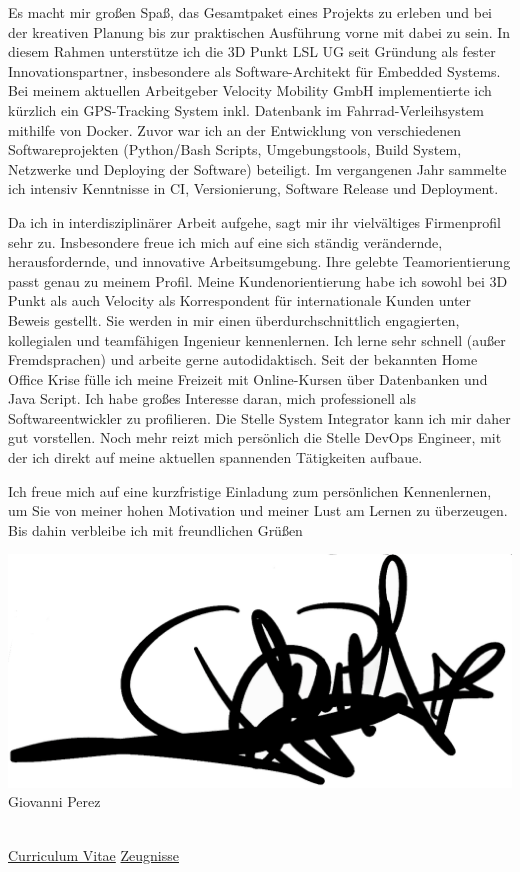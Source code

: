 \documentclass[a4paper,10pt]{article}
\begin{document}
Es macht mir großen Spaß, das Gesamtpaket eines Projekts zu erleben und bei der kreativen Planung bis zur praktischen Ausführung vorne mit dabei zu sein. In diesem Rahmen unterstütze ich die 3D Punkt LSL UG seit Gründung als fester Innovationspartner, insbesondere als Software-Architekt für Embedded Systems. Bei meinem aktuellen Arbeitgeber Velocity Mobility GmbH implementierte ich kürzlich ein GPS-Tracking System inkl. Datenbank im Fahrrad-Verleihsystem mithilfe von Docker. Zuvor war ich an der Entwicklung von verschiedenen Softwareprojekten (Python/Bash Scripts, Umgebungstools, Build System, Netzwerke und Deploying der Software) beteiligt. Im vergangenen Jahr sammelte ich intensiv Kenntnisse in CI, Versionierung, Software Release und Deployment.  \vfill

Da ich in interdisziplinärer Arbeit aufgehe, sagt mir ihr vielvältiges Firmenprofil sehr zu. Insbesondere freue ich mich auf eine sich ständig verändernde, herausfordernde, und innovative Arbeitsumgebung. Ihre gelebte Teamorientierung passt genau zu meinem Profil. Meine Kundenorientierung habe ich sowohl bei 3D Punkt als auch Velocity als Korrespondent für internationale Kunden unter Beweis gestellt.\vfill
Sie werden in mir einen überdurchschnittlich engagierten, kollegialen und teamfähigen Ingenieur kennenlernen. Ich lerne sehr schnell (außer Fremdsprachen) und arbeite gerne autodidaktisch. Seit der bekannten Home Office Krise fülle ich meine Freizeit mit Online-Kursen über Datenbanken und Java Script. Ich habe großes Interesse daran, mich professionell als Softwareentwickler zu profilieren. Die Stelle System Integrator kann ich mir daher gut vorstellen. Noch mehr reizt mich persönlich die Stelle DevOps Engineer, mit der ich direkt auf meine aktuellen spannenden Tätigkeiten aufbaue. \vfill

Ich freue mich auf eine kurzfristige Einladung zum persönlichen Kennenlernen, um Sie von meiner
hohen Motivation und meiner Lust am Lernen zu überzeugen. Bis dahin verbleibe ich\vfill
mit freundlichen Grüßen



\begin{minipage}[c][3cm][b]{4cm}
        \includegraphics[width=0.7\linewidth]{pics/firma.png}
        \centering Giovanni Perez
\end{minipage}
\hfill
\begin{minipage}[c][3cm][b]{4cm}
\\ \hspace{0.5cm}
\href{page.3}{Curriculum Vitae}
\href{https://www.dropbox.com/s/eupscb6bi17vcpj/Perez_Zeugnisse.pdf?dl=0}{Zeugnisse}
\end{minipage}



\pagebreak
\end{document}
